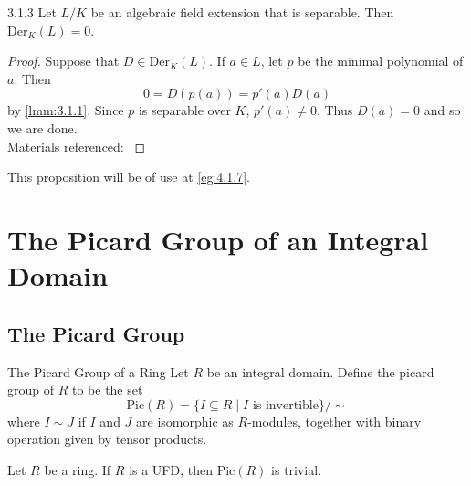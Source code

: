 \documentclass[a4paper]{article}
\begin{document}
\begin{prp}{}{3.1.3} Let $L/K$ be an algebraic field extension that is separable. Then $\text{Der}_K(L)=0$. \tcbline
\begin{proof}
Suppose that $D\in\text{Der}_K(L)$. If $a\in L$, let $p$ be the minimal polynomial of $a$. Then $$0=D(p(a))=p'(a)D(a)$$ by \ref{lmm:3.1.1}. Since $p$ is separable over $K$, $p'(a)\neq 0$. Thus $D(a)=0$ and so we are done. \\
Materials referenced: \cite{Pat}
\end{proof}
\end{prp}

This proposition will be of use at \ref{eg:4.1.7}. 

\pagebreak
\section{The Picard Group of an Integral Domain}
\subsection{The Picard Group}
\begin{defn}{The Picard Group of a Ring}{} Let $R$ be an integral domain. Define the picard group of $R$ to be the set $$\text{Pic}(R)=\{I\subseteq R\;|\;I\text{ is invertible}\}/\sim$$ where $I\sim J$ if $I$ and $J$ are isomorphic as $R$-modules, together with binary operation given by tensor products. 
\end{defn}

\begin{lmm}{}{} Let $R$ be a ring. If $R$ is a UFD, then $\text{Pic}(R)$ is trivial. 
\end{lmm}
\end{document}
